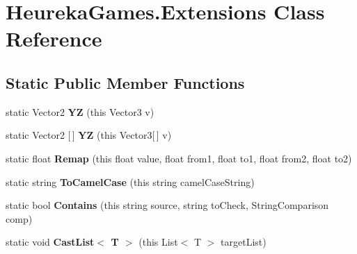 \hypertarget{class_heureka_games_1_1_extensions}{}\section{Heureka\+Games.\+Extensions Class Reference}
\label{class_heureka_games_1_1_extensions}
\subsection*{Static Public Member Functions}
\begin{DoxyCompactItemize}
\item 
\mbox{\label{class_heureka_games_1_1_extensions_a438234888b6ec5d86a6701e2ad25c034}} 
static Vector2 {\bfseries YZ} (this Vector3 v)
\item 
\mbox{\label{class_heureka_games_1_1_extensions_a6dd9833bc9eadbe24b3eb68f542a93d7}} 
static Vector2 \mbox{[}$\,$\mbox{]} {\bfseries YZ} (this Vector3\mbox{[}$\,$\mbox{]} v)
\item 
\mbox{\label{class_heureka_games_1_1_extensions_a7147d8a7c7bac1f5149a216adc58191d}} 
static float {\bfseries Remap} (this float value, float from1, float to1, float from2, float to2)
\item 
\mbox{\label{class_heureka_games_1_1_extensions_a14d28fd903f823f5c8b16a2b4dc54aaf}} 
static string {\bfseries To\+Camel\+Case} (this string camel\+Case\+String)
\item 
\mbox{\label{class_heureka_games_1_1_extensions_a12109e85225aabcafab9a90a57982ec2}} 
static bool {\bfseries Contains} (this string source, string to\+Check, String\+Comparison comp)
\item 
\mbox{\label{class_heureka_games_1_1_extensions_a71e38772d71cbdda034e3f7770d602ba}} 
static void {\bfseries Cast\+List$<$ T $>$} (this List$<$ T $>$ target\+List)
\item 
\mbox{\label{class_heureka_games_1_1_extensions_a4ec23ec95178c618381da89506905593}} 

\end{DoxyCompactItemize}
